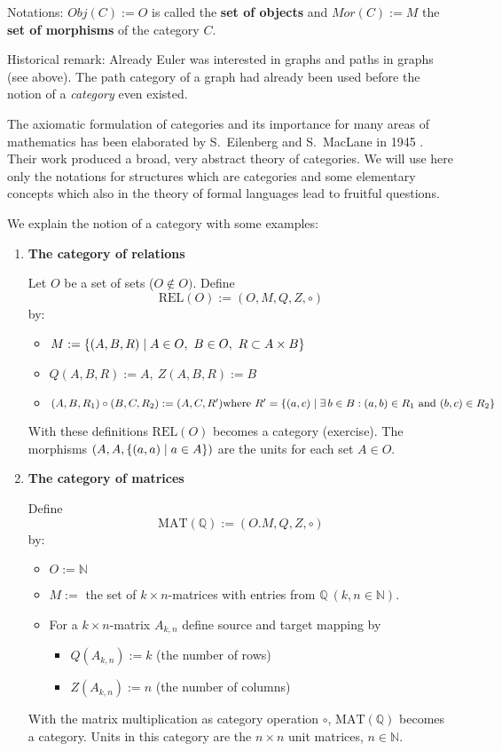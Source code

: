 Notations: $Obj(C) := O$ is called the {\bf set of objects} and $Mor(C) := M$
the {\bf set of morphisms} of the category $C$.

Historical remark: Already Euler was interested in graphs and paths in
graphs (see above). The path category of a graph had already been used
before the notion of a {\em category} even existed.

The axiomatic formulation of categories and its importance for many areas of
mathematics has been elaborated by S.\ Eilenberg and S.\ MacLane in 1945
\cite{EiMa}. Their work produced a broad, very abstract theory of categories. We
will use here only the notations for structures which are categories and some 
elementary concepts which also in the theory of formal languages lead to 
fruitful questions.

We explain the notion of a category with some examples:
\begin{enumerate}
  \item {\bf The category of relations}
  
  Let $O$ be a set of sets ($O \notin O)$. Define 
  \[ \mathrm{REL}(O) := (O, M, Q, Z,\circ) \] by:
  \begin{itemize}
  	\item[] $M := \mbox{$\{(A,B,R) \mid A \in O,\ B \in O,\ R \subset A \times B\}$}$
  	\item[] $Q(A,B,R) := A, \ Z(A,B,R) := B$
  	\item[] $(A,B,R_1) \circ (B,C,R_2) := (A,C,R')\\
  	\text{where }R'= \mbox{$\{(a, c) \mid \exists\, b \in B: (a, b)\in R_1\text{
  	and }(b, c)\in R_2\}$}$
  \end{itemize}
  With these definitions $\mathrm{REL}(O)$ becomes a category (exercise). The
  morphisms $(A, A, \mbox{$\{(a, a) \mid a \in A\}$})$ are the units for each set $A
  \in O$.

  \item {\bf The category of matrices}
  
  Define 
  \[ \mathrm{MAT}(\mathbb{Q}) := (O. M, Q, Z, \circ) \]
  by:
  \begin{itemize}
    \item[] $O := \mathbb{N}$
    \item[] $M :=$ the set of $k \times n$-matrices with entries from
    $\mathbb{Q}\ (k, n \in \mathbb{N})$.
    \item[] For a $k \times n$-matrix $A_{k,n}$ define source and target
    mapping by
    \begin{itemize}
	    \item[] $Q(A_{k,n}) := k$ (the number of rows)
  	  \item[] $Z(A_{k,n}) := n$ (the number of columns)
    \end{itemize}
  \end{itemize}
	With the matrix multiplication as category operation $\circ$,
	$\mathrm{MAT}(\mathbb{Q})$ becomes a category. Units in this category are
	the $n\times n$ unit matrices, $n \in \mathbb{N}$.
\end{enumerate}

